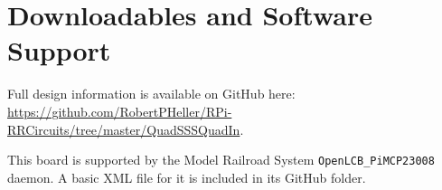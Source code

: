 \section{Downloadables and Software Support}

Full design information is available on GitHub here:
\url{https://github.com/RobertPHeller/RPi-RRCircuits/tree/master/QuadSSSQuadIn}.

This board is supported by the Model Railroad System
\texttt{OpenLCB\_PiMCP23008} daemon. A basic XML file for it is included in 
its GitHub folder. 

